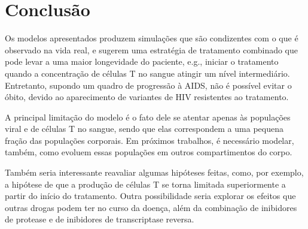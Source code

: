 \section{Conclusão}

Os modelos apresentados produzem simulações que são condizentes com o que é observado na vida real, e sugerem uma estratégia de tratamento combinado que pode levar a uma maior longevidade do paciente, e.g., iniciar o tratamento quando a concentração de células T no sangue atingir um nível intermediário.
Entretanto, supondo um quadro de progressão à AIDS, não é possível evitar o óbito,
devido ao aparecimento de variantes de HIV resistentes ao tratamento.

A principal limitação do modelo é o fato dele se atentar apenas às populações viral e de células T no sangue, sendo que elas correspondem a uma pequena fração das populações corporais.
Em próximos trabalhos, é necessário modelar, também, como evoluem essas populações em outros compartimentos do corpo.

Também seria interessante reavaliar algumas hipóteses feitas, como, por exemplo, a hipótese de que a produção de células T se torna limitada superiormente a partir do início do tratamento.
Outra possibilidade seria explorar os efeitos que outras drogas podem ter no curso da doença, além da combinação de inibidores de protease e de inibidores de transcriptase reversa.
